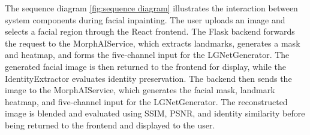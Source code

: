 \clearpage
\noindent The sequence diagram \ref{fig:sequence diagram} illustrates the interaction between system components during facial inpainting. The user uploads an image and selects a facial region through the React frontend. The Flask backend forwards the request to the MorphAIService, which extracts landmarks, generates a mask and heatmap, and forms the five-channel input for the LGNetGenerator. The generated facial image is then returned to the frontend for display, while the IdentityExtractor evaluates identity preservation.
\newline
\noindent The backend then sends the image to the MorphAIService, which generates the facial mask, landmark heatmap, and five-channel input for the LGNetGenerator. The reconstructed image is blended and evaluated using SSIM, PSNR, and identity similarity before being returned to the frontend and displayed to the user.









